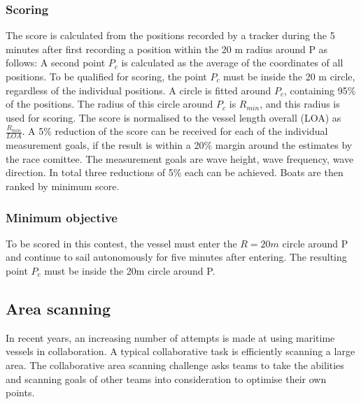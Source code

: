 \documentclass[12pt]{article}
\begin{document}
\subsubsection{Scoring}
The score is calculated from the positions recorded by a tracker during the 5
minutes after first recording a position within the 20 m radius around P as
follows:
A second point $P_c$ is calculated as the average of the coordinates of all
positions. To be qualified for scoring, the point $P_c$ must be
inside the 20 m circle, regardless of the individual positions.
A circle is fitted around $P_c$, containing 95\% of the positions.
The radius of this circle around $P_c$ is $R_{min}$, and this radius is used for
scoring. The score is normalised to the vessel length overall (LOA) as 
$\frac{R_{min}}{LOA}$. 
A 5\% reduction of the score can be received for each of the individual
measurement goals, if the result is within a 20\% margin around 
the estimates by the race comittee. The measurement goals are
wave height, wave frequency, wave direction. In total three reductions of 5\%
each can be achieved. Boats are then ranked by minimum score.

\subsubsection{Minimum objective}
To be scored in this contest, the vessel must enter the $R=20m$ circle around P
and continue to sail autonomously for five minutes after entering. The resulting 
point $P_c$ must be inside the 20m circle around P.

\subsection{Area scanning}
In recent years, an increasing number of attempts is made at using maritime
vessels in collaboration. A typical
collaborative task is efficiently scanning a large area.
The collaborative area scanning challenge asks teams to take the abilities and
scanning goals of other teams into consideration to optimise their own points.
\end{document}
